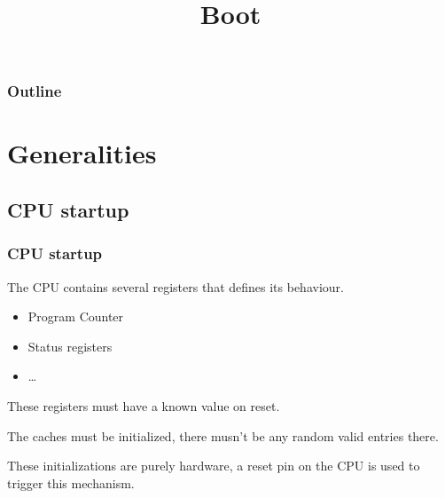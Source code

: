 %
%
%
%
%
%

%
%

%
%

\def\path{../../../..}

%
%



%
%

\title{Boot}

%
%



%
%

\begin{frame}
  \titlepage
\end{frame}

%
%

\begin{frame}
  \frametitle{Outline}

  \tableofcontents
\end{frame}

%
%

%
%

\section{Generalities}
\subsection{CPU startup}

\begin{frame}
  \frametitle{CPU startup}

  The CPU contains several registers that defines its behaviour.

  \-

  \begin{itemize}
  \item Program Counter
  \item Status registers
  \item \ldots
  \end{itemize}

  \-

  These registers must have a known value on reset.

  \-

  The caches must be initialized, there musn't be any random valid entries there.

  \-

  These initializations are purely hardware, a reset pin on the CPU is used to trigger this mechanism.

\end{frame}

